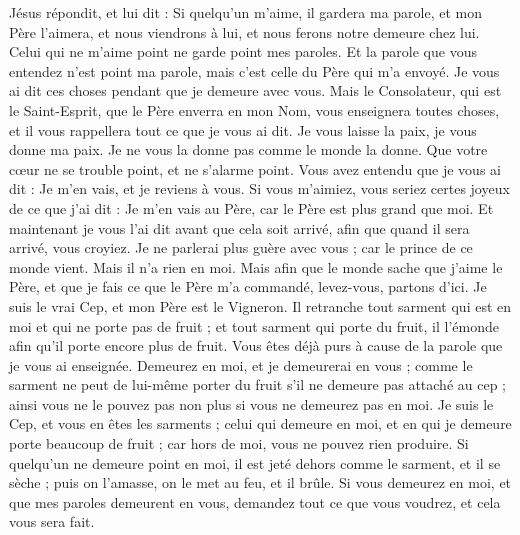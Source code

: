 \begin{multicols}{2}
Jésus répondit, et lui dit : Si quelqu'un m'aime, il gardera ma parole, et mon Père l'aimera, et nous viendrons à lui, et nous ferons notre demeure chez lui.
Celui qui ne m'aime point ne garde point mes paroles. Et la parole que vous entendez n'est point ma parole, mais c'est celle du Père qui m'a envoyé.
Je vous ai dit ces choses pendant que je demeure avec vous.
Mais le Consolateur, qui est le Saint-Esprit, que le Père enverra en mon Nom, vous enseignera toutes choses, et il vous rappellera tout ce que je vous ai dit.
Je vous laisse la paix, je vous donne ma paix. Je ne vous la donne pas comme le monde la donne. Que votre cœur ne se trouble point, et ne s'alarme point.
Vous avez entendu que je vous ai dit : Je m'en vais, et je reviens à vous. Si vous m'aimiez, vous seriez certes joyeux de ce que j'ai dit : Je m'en vais au Père, car le Père est plus grand que moi.
Et maintenant je vous l'ai dit avant que cela soit arrivé, afin que quand il sera arrivé, vous croyiez.
Je ne parlerai plus guère avec vous ; car le prince de ce monde vient. Mais il n'a rien en moi.
Mais afin que le monde sache que j'aime le Père, et que je fais ce que le Père m'a commandé, levez-vous, partons d'ici.
\VerseOne{}Je suis le vrai Cep, et mon Père est le Vigneron.
Il retranche tout sarment qui est en moi et qui ne porte pas de fruit ; et tout sarment qui porte du fruit, il l'émonde afin qu'il porte encore plus de fruit.
Vous êtes déjà purs à cause de la parole que je vous ai enseignée.
Demeurez en moi, et je demeurerai en vous ; comme le sarment ne peut de lui-même porter du fruit s'il ne demeure pas attaché au cep ; ainsi vous ne le pouvez pas non plus si vous ne demeurez pas en moi.
Je suis le Cep, et vous en êtes les sarments ; celui qui demeure en moi, et en qui je demeure porte beaucoup de fruit ; car hors de moi, vous ne pouvez rien produire.
Si quelqu'un ne demeure point en moi, il est jeté dehors comme le sarment, et il se sèche ; puis on l'amasse, on le met au feu, et il brûle.
Si vous demeurez en moi, et que mes paroles demeurent en vous, demandez tout ce que vous voudrez, et cela vous sera fait.

\end{multicols}

